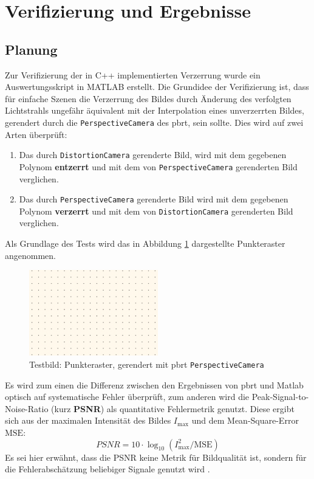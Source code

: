 \section{Verifizierung und Ergebnisse}
\subsection{Planung}
Zur Verifizierung der in C++ implementierten Verzerrung wurde ein Auswertungsskript in MATLAB erstellt. Die Grundidee der Verifizierung ist, dass für einfache Szenen die Verzerrung des Bildes durch Änderung des verfolgten Lichtstrahls ungefähr äquivalent mit der Interpolation eines unverzerrten Bildes, gerendert durch die \texttt{PerspectiveCamera} des pbrt, sein sollte.
Dies wird auf zwei Arten überprüft:
\begin{enumerate}
	\item Das durch \texttt{DistortionCamera} gerenderte Bild, wird mit dem gegebenen Polynom \textbf{entzerrt} und mit dem von \texttt{PerspectiveCamera} gerenderten Bild verglichen.
	\item Das durch \texttt{PerspectiveCamera} gerenderte Bild wird mit dem gegebenen Polynom \textbf{verzerrt} und mit dem von \texttt{DistortionCamera} gerenderten Bild verglichen.
\end{enumerate}

Als Grundlage des Tests wird das in Abbildung \ref{fig:test_img} dargestellte Punkteraster angenommen. 

\begin{figure}[h]
	\centering
	\includegraphics[width=0.5\textwidth]{img/dot_perspective.png}
	\caption{Testbild: Punkteraster, gerendert mit pbrt \texttt{PerspectiveCamera}}
	\label{fig:test_img}
\end{figure}

Es wird zum einen die Differenz zwischen den Ergebnissen von pbrt und Matlab optisch auf systematische Fehler überprüft, zum anderen wird die Peak-Signal-to-Noise-Ratio (kurz \textbf{PSNR}) als quantitative Fehlermetrik genutzt.
Diese ergibt sich aus der maximalen Intensität des Bildes $I_\text{max}$ und dem Mean-Square-Error $\text{MSE}$:
\begin{equation}
	PSNR = 10\cdot \log_{10} (I_\text{max}^2/\text{MSE})
\end{equation}
Es sei hier erwähnt, dass die PSNR keine Metrik für Bildqualität ist, sondern für die Fehlerabschätzung beliebiger Signale genutzt wird \cite{Akramullah2014}.

